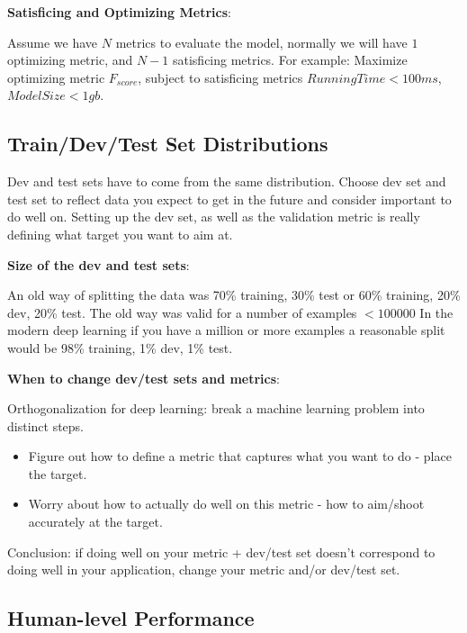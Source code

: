 \documentclass{article}
\begin{document}
\noindent \textbf{Satisficing and Optimizing Metrics}:

\noindent Assume we have \(N\) metrics to evaluate the model, normally we will have \(1\) optimizing metric, and \(N - 1\) satisficing metrics. For example: Maximize optimizing metric \(F_{score}\), subject to satisficing metrics \(RunningTime < 100ms\), \(ModelSize < 1gb\).

\subsection{Train/Dev/Test Set Distributions}

Dev and test sets have to come from the same distribution. Choose dev set and test set to reflect data you expect to get in the future and consider important to do well on. Setting up the dev set, as well as the validation metric is really defining what target you want to aim at.

\bigskip

\noindent \textbf{Size of the dev and test sets}:

\noindent An old way of splitting the data was 70\% training, 30\% test or 60\% training, 20\% dev, 20\% test. The old way was valid for a number of examples \(< 100000\) In the modern deep learning if you have a million or more examples a reasonable split would be 98\% training, 1\% dev, 1\% test.

\bigskip

\noindent \textbf{When to change dev/test sets and metrics}:

\noindent Orthogonalization for deep learning: break a machine learning problem into distinct steps.

\begin{itemize}
    \item Figure out how to define a metric that captures what you want to do - place the target.
    \item Worry about how to actually do well on this metric - how to aim/shoot accurately at the target.
\end{itemize}

\noindent Conclusion: if doing well on your metric + dev/test set doesn't correspond to doing well in your application, change your metric and/or dev/test set.

\subsection{Human-level Performance}
\end{document}
